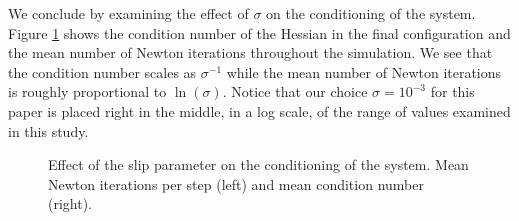 We conclude by examining the effect of $\sigma$ on the conditioning of the
system. Figure \ref{fig:clutter_sigma} shows the condition number of the Hessian
in the final configuration and the mean number of Newton iterations throughout
the simulation. We see that the condition number scales as $\sigma^{-1}$ while
the mean number of Newton iterations is roughly proportional to  $\ln(\sigma)$.
Notice that our choice $\sigma=10^{-3}$ for this paper is placed right in the
middle, in a log scale, of the range of values examined in this study.
\begin{figure}[!h]
	\centering
	\caption{\label{fig:clutter_sigma} 
	Effect of the slip parameter on the conditioning of the system. Mean Newton iterations per step (left) and mean condition number (right).}
\end{figure}
